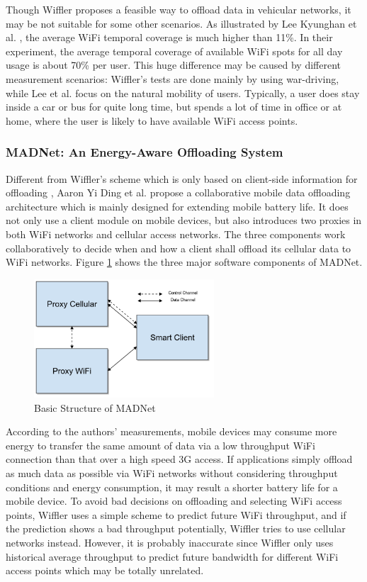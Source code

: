 \documentclass[english]{tktltiki}
\begin{document}
Though Wiffler proposes a feasible way to offload data in vehicular networks, it may be not suitable for some other scenarios. As illustrated by Lee Kyunghan et al. \cite{lly+10}, the average WiFi temporal coverage is much higher than 11\%. In their experiment, the average temporal coverage of available WiFi spots for all day usage is about 70\% per user. This huge difference may be caused by different measurement scenarios: Wiffler's tests are done mainly by using war-driving, while Lee et al. focus on the natural mobility of users. Typically, a user does stay inside a car or bus for quite long time, but spends a lot of time in office or at home, where the user is likely to have available WiFi access points. 

\subsubsection{MADNet: An Energy-Aware Offloading System}

Different from Wiffler's scheme which is only based on client-side information for offloading , Aaron Yi Ding et al. \cite{dhx+13} propose a collaborative mobile data offloading architecture which is mainly designed for extending mobile battery life. It does not only use a client module on mobile devices, but also introduces two proxies in both WiFi networks and cellular access networks. The three components work collaboratively to decide when and how a client shall offload its cellular data to WiFi networks. Figure \ref{fig:madnet} shows the three major software components of MADNet.

\begin{figure}[htbp]
  \centering
  \includegraphics[width=0.6\textwidth]{images/madnet.png}
  \caption{Basic Structure of MADNet \cite{dhx+13}}
  \label{fig:madnet}
\end{figure}

According to the authors' measurements, mobile devices may consume more energy to transfer the same amount of data via a low throughput WiFi connection than that over a high speed 3G access. If applications simply offload as much data as possible via WiFi networks without considering throughput conditions and energy consumption, it may result a shorter battery life for a mobile device. To avoid bad decisions on offloading and selecting WiFi access points, Wiffler uses a simple scheme to predict future WiFi throughput, and if the prediction shows a bad throughput potentially, Wiffler tries to use cellular networks instead. However, it is probably inaccurate since Wiffler only uses historical average throughput to predict future bandwidth for different WiFi access points which may be totally unrelated.
\end{document}
